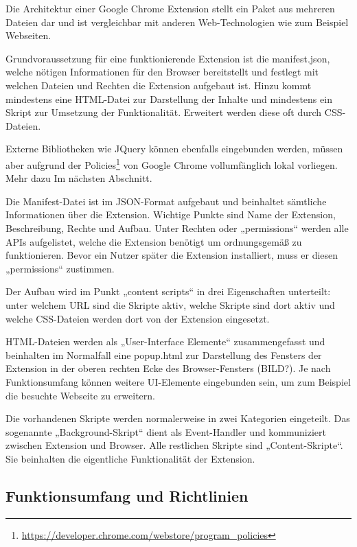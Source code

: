 Die Architektur einer Google Chrome Extension stellt ein Paket aus mehreren Dateien dar und ist vergleichbar mit anderen Web-Technologien wie zum Beispiel Webseiten.

Grundvoraussetzung für eine funktionierende Extension ist die manifest.json, welche nötigen Informationen für den Browser bereitstellt und festlegt mit welchen Dateien und Rechten die Extension aufgebaut ist. Hinzu kommt mindestens eine HTML-Datei zur Darstellung der Inhalte und mindestens ein Skript zur Umsetzung der Funktionalität. Erweitert werden diese oft durch CSS-Dateien.

Externe Bibliotheken wie JQuery können ebenfalls eingebunden werden, müssen aber aufgrund der Policies\footnote{\url{https://developer.chrome.com/webstore/program_policies}} von Google Chrome vollumfänglich lokal vorliegen. Mehr dazu Im nächsten Abschnitt.

Die Manifest-Datei ist im JSON-Format aufgebaut und beinhaltet sämtliche Informationen über die Extension. Wichtige Punkte sind Name der Extension, Beschreibung, Rechte und Aufbau. Unter Rechten oder „permissions“ werden alle APIs aufgelistet, welche die Extension benötigt um ordnungsgemäß zu funktionieren. Bevor ein Nutzer später die Extension installiert, muss er diesen „permissions“ zustimmen.

Der Aufbau wird im Punkt „content scripts“ in drei Eigenschaften unterteilt: unter welchem URL sind die Skripte aktiv, welche Skripte sind dort aktiv und welche CSS-Dateien werden dort von der Extension eingesetzt.

HTML-Dateien werden als „User-Interface Elemente“ zusammengefasst und beinhalten im Normalfall eine popup.html zur Darstellung des Fensters der Extension in der oberen rechten Ecke des Browser-Fensters (BILD?). Je nach Funktionsumfang können weitere UI-Elemente eingebunden sein, um zum Beispiel die besuchte Webseite zu erweitern.

Die vorhandenen Skripte werden normalerweise in zwei Kategorien eingeteilt. Das sogenannte „Background-Skript“ dient als Event-Handler und kommuniziert zwischen Extension und Browser. Alle restlichen Skripte sind „Content-Skripte“. Sie beinhalten die eigentliche Funktionalität der Extension. 

\subsection{Funktionsumfang und Richtlinien}
\label{ss:funktionsumfang}

